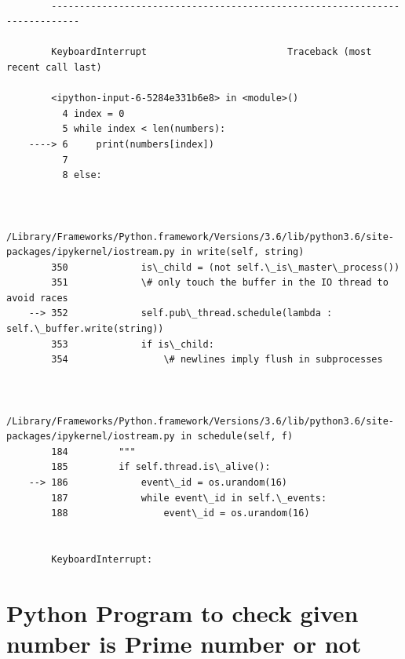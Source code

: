 \documentclass[11pt]{article}
\begin{document}
    \begin{Verbatim}[commandchars=\\\{\}]

        ---------------------------------------------------------------------------

        KeyboardInterrupt                         Traceback (most recent call last)

        <ipython-input-6-5284e331b6e8> in <module>()
          4 index = 0
          5 while index < len(numbers):
    ----> 6     print(numbers[index])
          7 
          8 else:
    

        /Library/Frameworks/Python.framework/Versions/3.6/lib/python3.6/site-packages/ipykernel/iostream.py in write(self, string)
        350             is\_child = (not self.\_is\_master\_process())
        351             \# only touch the buffer in the IO thread to avoid races
    --> 352             self.pub\_thread.schedule(lambda : self.\_buffer.write(string))
        353             if is\_child:
        354                 \# newlines imply flush in subprocesses
    

        /Library/Frameworks/Python.framework/Versions/3.6/lib/python3.6/site-packages/ipykernel/iostream.py in schedule(self, f)
        184         """
        185         if self.thread.is\_alive():
    --> 186             event\_id = os.urandom(16)
        187             while event\_id in self.\_events:
        188                 event\_id = os.urandom(16)
    

        KeyboardInterrupt: 

    \end{Verbatim}

    \section{Python Program to check given number is Prime number or
not}\label{python-program-to-check-given-number-is-prime-number-or-not}
\end{document}
